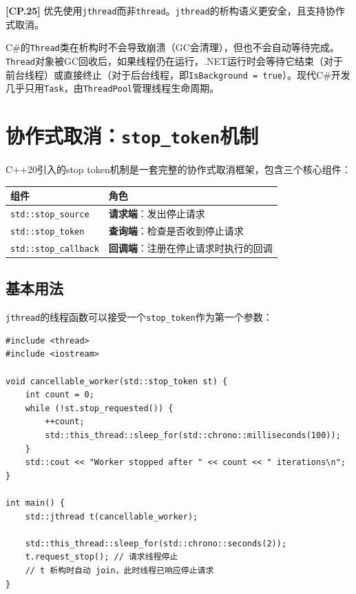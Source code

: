 \documentclass[12pt,a4paper,fontset=fandol]{ctexbook}
\newcommand{\cpp}[1]{C++#1}
\newcommand{\guideref}[1]{\textbf{\textcolor{blue!70!black}{[#1]}}}
\newcommand{\csharp}{C\#}
\begin{document}
\begin{guideline}
\guideref{CP.25} 优先使用\texttt{jthread}而非\texttt{thread}。\texttt{jthread}的析构语义更安全，且支持协作式取消。
\end{guideline}

\begin{compare}
\csharp{}的\texttt{Thread}类在析构时不会导致崩溃（GC会清理），但也不会自动等待完成。\texttt{Thread}对象被GC回收后，如果线程仍在运行，.NET运行时会等待它结束（对于前台线程）或直接终止（对于后台线程，即\texttt{IsBackground = true}）。现代\csharp{}开发几乎只用\texttt{Task}，由\texttt{ThreadPool}管理线程生命周期。
\end{compare}

\chapter{协作式取消：\texttt{stop\_token}机制}

\cpp{}20引入的stop token机制是一套完整的协作式取消框架，包含三个核心组件：

\begin{longtable}{lp{8cm}}
\toprule
\textbf{组件} & \textbf{角色} \\
\midrule
\texttt{std::stop\_source} & \textbf{请求端}：发出停止请求 \\
\texttt{std::stop\_token} & \textbf{查询端}：检查是否收到停止请求 \\
\texttt{std::stop\_callback} & \textbf{回调端}：注册在停止请求时执行的回调 \\
\bottomrule
\end{longtable}

\section{基本用法}

\texttt{jthread}的线程函数可以接受一个\texttt{stop\_token}作为第一个参数：

\begin{lstlisting}
#include <thread>
#include <iostream>

void cancellable_worker(std::stop_token st) {
    int count = 0;
    while (!st.stop_requested()) {
        ++count;
        std::this_thread::sleep_for(std::chrono::milliseconds(100));
    }
    std::cout << "Worker stopped after " << count << " iterations\n";
}

int main() {
    std::jthread t(cancellable_worker);

    std::this_thread::sleep_for(std::chrono::seconds(2));
    t.request_stop(); // 请求线程停止
    // t 析构时自动 join，此时线程已响应停止请求
}
\end{lstlisting}
\end{document}
